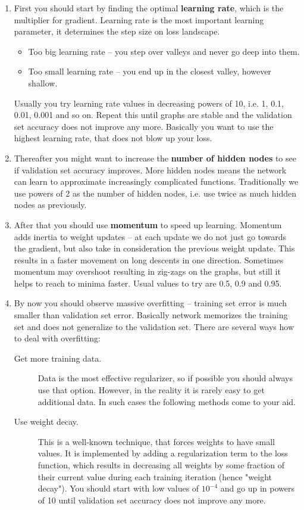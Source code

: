 \documentclass[a4paper,11pt]{article}
\begin{document}
\begin{enumerate}
	\item First you should start by finding the optimal \textbf{learning rate}, which is the multiplier for gradient. Learning rate is the most important learning parameter, it determines the step size on loss landscape. 
	\begin{itemize}	
		\item Too big learning rate -- you step over valleys and never go deep into them. 
		\item Too small learning rate -- you end up in the closest valley, however shallow. 
	\end{itemize}
	Usually you try learning rate values in decreasing powers of 10, i.e. 1, 0.1, 0.01, 0.001 and so on. Repeat this until graphs are stable and the validation set accuracy does not improve any more. Basically you want to use the highest learning rate, that does not blow up your loss.
	\item Thereafter you might want to increase the \textbf{number of hidden nodes} to see if validation set accuracy improves. More hidden nodes means the network can learn to approximate increasingly complicated functions. Traditionally we use powers of 2 as the number of hidden nodes, i.e. use twice as much hidden nodes as previously.
	\item After that you should use \textbf{momentum} to speed up learning. Momentum adds inertia to weight updates -- at each update we do not just go towards the gradient, but also take in consideration the previous weight update. This results in a faster movement on long descents in one direction. Sometimes momentum may overshoot resulting in zig-zags on the graphs, but still it helps to reach to minima faster. Usual values to try are 0.5, 0.9 and 0.95.
	\item By now you should observe massive overfitting -- training set error is much smaller than validation set error. Basically network memorizes the training set and does not generalize to the validation set. There are several ways how to deal with overfitting:
	\begin{description}
		\item[Get more training data.] Data is the most effective regularizer, so if possible you should always use that option. However, in the reality it is rarely easy to get additional data. In such cases the following methods come to your aid.
		\item[Use weight decay.] This is a well-known technique, that forces weights to have small values. It is implemented by adding a regularization term to the loss function, which results in decreasing all weights by some fraction of their current value during each training iteration (hence "weight decay"). You should start with low values of $10^{-4}$ and go up in powers of 10 until validation set accuracy does not improve any more.

\end{description}
\end{enumerate}
\end{document}
